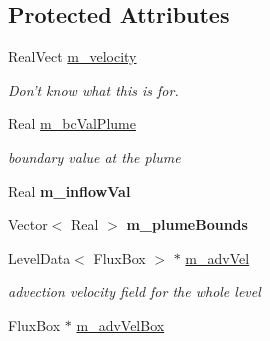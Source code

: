 \subsection*{Protected Attributes}
\begin{DoxyCompactItemize}
\item 
\hypertarget{class_advect_i_b_c_a7d844d0407883309028ab564f3b20261}{Real\-Vect \hyperlink{class_advect_i_b_c_a7d844d0407883309028ab564f3b20261}{m\-\_\-velocity}}\label{class_advect_i_b_c_a7d844d0407883309028ab564f3b20261}

\begin{DoxyCompactList}\small\item\em Don't know what this is for. \end{DoxyCompactList}\item 
\hypertarget{class_advect_i_b_c_a5737cd993143b522c10599caa94e849f}{Real \hyperlink{class_advect_i_b_c_a5737cd993143b522c10599caa94e849f}{m\-\_\-bc\-Val\-Plume}}\label{class_advect_i_b_c_a5737cd993143b522c10599caa94e849f}

\begin{DoxyCompactList}\small\item\em boundary value at the plume \end{DoxyCompactList}\item 
\hypertarget{class_advect_i_b_c_aeb567fe955fff5c26c250a77b1bd2762}{Real {\bfseries m\-\_\-inflow\-Val}}\label{class_advect_i_b_c_aeb567fe955fff5c26c250a77b1bd2762}

\item 
\hypertarget{class_advect_i_b_c_a4149bd47a240acfc4de71ff74e10df1d}{Vector$<$ Real $>$ {\bfseries m\-\_\-plume\-Bounds}}\label{class_advect_i_b_c_a4149bd47a240acfc4de71ff74e10df1d}

\item 
\hypertarget{class_advect_i_b_c_a2fd99ddeaa84fbadf49657de8491998f}{Level\-Data$<$ Flux\-Box $>$ $\ast$ \hyperlink{class_advect_i_b_c_a2fd99ddeaa84fbadf49657de8491998f}{m\-\_\-adv\-Vel}}\label{class_advect_i_b_c_a2fd99ddeaa84fbadf49657de8491998f}

\begin{DoxyCompactList}\small\item\em advection velocity field for the whole level \end{DoxyCompactList}\item 
\hypertarget{class_advect_i_b_c_a34ee29705f4f1205a75f0c725a135a1a}{Flux\-Box $\ast$ \hyperlink{class_advect_i_b_c_a34ee29705f4f1205a75f0c725a135a1a}{m\-\_\-adv\-Vel\-Box}}\label{class_advect_i_b_c_a34ee29705f4f1205a75f0c725a135a1a}


\end{DoxyCompactItemize}
